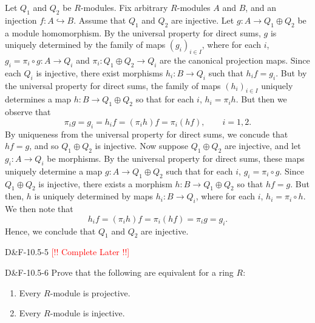 \documentclass{article}
\newcommand{\embedd}{\hookrightarrow}
\newcommand{\complete}{\textcolor{red}{[!! Complete Later !!]}}
\begin{document}
	Let $Q_{1}$ and $Q_{2}$ be $R$-modules. Fix arbitrary $R$-modules $A$ and $B$, and an injection $f: A\embedd B$. Assume that $Q_{1}$ and $Q_{2}$ are injective. Let $g: A \to Q_{1} \oplus Q_{2}$ be a module homomorphism. By the universal property for direct sums, $g$ is uniquely determined by the family of maps $(g_{i})_{i \in I}$, where for each $i$, $g_{i} = \pi_{i} \circ g: A \to Q_{i}$ and $\pi_{i}: Q_{1} \oplus Q_{2} \to Q_{i}$ are the canonical projection maps. Since each $Q_{i}$ is injective, there exist morphisms $h_{i}: B \to Q_{i}$ such that $h_{i}f = g_{i}$. But by the universal property for direct sums, the family of maps $(h_{i})_{i \in I}$ uniquely determines a map $h: B \to Q_{1} \oplus Q_{2}$ so that for each $i$, $h_{i} = \pi_{i}h$. But then we observe that 
	\begin{equation*}
		\pi_{i}g = g_{i} = h_{i}f = (\pi_{i}h)f = \pi_{i}(hf), \qquad i = 1, 2.
	\end{equation*}
	By uniqueness from the universal property for direct sums, we concude that $hf = g$, and so $Q_{1} \oplus Q_{2}$ is injective. Now suppose $Q_{1} \oplus Q_{2}$ are injective, and let $g_{i}: A \to Q_{i}$ be morphisms. By the universal property for direct sums, these maps uniquely determine a map $g: A \to Q_{1} \oplus Q_{2}$ such that for each $i$, $g_{i} = \pi_{i} \circ g$. Since $Q_{1} \oplus Q_{2}$ is injective, there exists a morphism $h: B \to Q_{1} \oplus Q_{2}$ so that $hf = g$. But then, $h$ is uniquely determined by maps $h_{i}: B \to Q_{i}$, where for each $i$, $h_{i} = \pi_{i} \circ h$. We then note that 
	\begin{equation*}
		h_{i}f = (\pi_{i}h)f = \pi_{i}(hf) = \pi_{i}g = g_{i}. 
	\end{equation*}
	Hence, we conclude that $Q_{1}$ and $Q_{2}$ are injective. 
	
	\begin{prb}{D\&F-10.5-5}
		\complete
	\end{prb}
	\begin{prb}{D\&F-10.5-6}
		Prove that the following are equivalent for a ring $R$: \vspace{-0.2cm}
		\begin{enumerate}[itemsep =-2pt,label = \textbf{(\roman{*})}]
			\item Every $R$-module is projective. 
			\item Every $R$-module is injective. 
		\end{enumerate}
	\end{prb}
	
\end{document}
